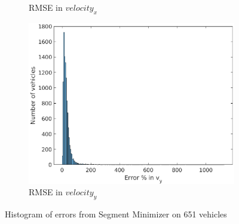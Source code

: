 \begin{figure}
\begin{subfigure}{.5\textwidth}
\caption{RMSE in $velocity_x$}
\end{subfigure}
\begin{subfigure}{.5\textwidth}
\centering
\includegraphics[width=.8\linewidth]{figures/s_cavYerror}
\caption{RMSE in $velocity_y$}
\end{subfigure}
\caption{Histogram of errors from Segment Minimizer on 651 vehicles }
\end{figure}
